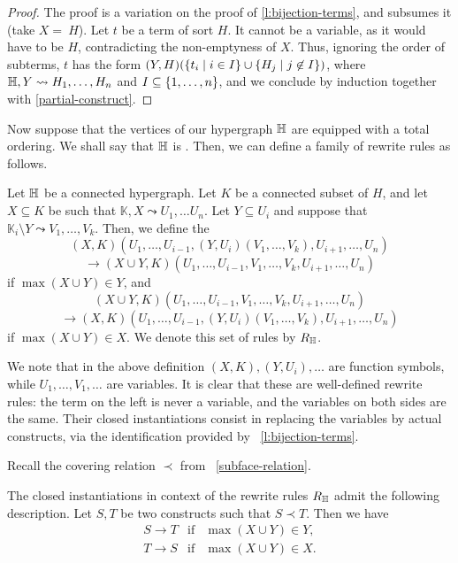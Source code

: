 \begin{proof}
The proof is a variation on the proof of \cref{l:bijection-terms}, and subsumes it (take $X=~H$).  
Let $t$ be a term  of  sort $H$. 
It cannot be a variable, as it would have to be $H$, contradicting the non-emptyness of $X$. 
Thus, ignoring the order of subterms, $t$ has the form $(Y,H)(\left\{t_i \mid i\in I\right\}\cup\left\{H_j \mid j\not\in I\right\})$, where ${\mathbb H},Y \leadsto H_1,\ldots,H_n$ and $I\subseteq\left\{1,\ldots,n\right\}$, and we conclude by induction together with \cref{partial-construct}.
\end{proof}


Now suppose that the vertices of our hypergraph ${\mathbb H}$ are equipped with a total ordering.
We shall say that ${\mathbb H}$ is .
Then, we can define a family of rewrite rules as follows.

\begin{definition} \label{def:rules}
  Let ${\mathbb H}$ be a connected hypergraph. 
  Let $K$ be a connected subset of $H$, and let $X \subseteq K$ be such that $\mathbb{K},X \leadsto U_1,\ldots U_n$.
  Let $Y \subseteq U_i$ and suppose that $\mathbb{K}_i\setminus Y \leadsto V_1,\ldots, V_k$. 
  Then, we define the 
  $$(X,K)(U_1,\ldots, U_{i-1},(Y,U_i)(V_1,\ldots, V_k),U_{i+1},\ldots,U_n)$$
  $$ \longrightarrow (X\cup Y,K)(U_1,\ldots,U_{i-1},V_1,\ldots, V_k,U_{i+1},\ldots,U_n)$$
  if $\max(X\cup Y)\in Y$, and 
  $$(X\cup Y,K)(U_1,\ldots,U_{i-1},V_1,\ldots, V_k,U_{i+1},\ldots,U_n)$$
  $$\longrightarrow (X,K)(U_1,\ldots, U_{i-1},(Y,U_i)(V_1,\ldots, V_k),U_{i+1},\ldots,U_n)$$
  if $\max(X\cup Y)\in X$.
  We denote this set of rules by $R_{\mathbb H}$.
\end{definition} 
We note that in the above definition $(X,K), (Y,U_i),\ldots$ are function symbols, while $U_1,\ldots,V_1,\ldots$ are variables.
It is clear that these are well-defined rewrite rules: the term on the left is never a variable, and the variables on both sides are the same.
Their closed instantiations consist in replacing the variables by actual constructs, via the identification provided by~ \cref{l:bijection-terms}.

Recall the covering relation $\prec$ from~ \cref{subface-relation}.
\begin{lemma} 
  The closed instantiations in context of the rewrite rules $R_{\mathbb H}$ admit the following description.
  Let $S,T$ be two constructs such that $S \prec T$.  Then we have
  $$\begin{array}{lll}
    S \to T &  \mathrm{if} & \max(X\cup Y)\in Y, \\
    T \to S & \mathrm{if} & \max(X\cup Y)\in X.
  \end{array}$$
\end{lemma} 

